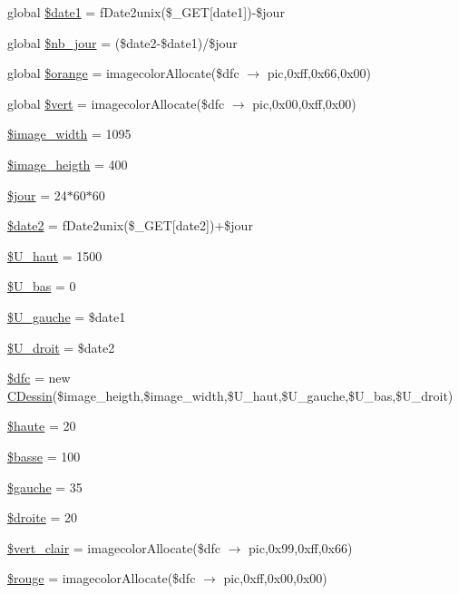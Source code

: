 \begin{CompactItemize}
\item 
global \hyperlink{graphe__veille__samu_8php_a0}{\$date1} = f\-Date2unix(\$\_\-GET\mbox{[}date1\mbox{]})-\$jour
\item 
global \hyperlink{graphe__veille__samu_8php_a1}{\$nb\_\-jour} = (\$date2-\$date1)/\$jour
\item 
global \hyperlink{graphe__veille__samu_8php_a2}{\$orange} = imagecolor\-Allocate(\$dfc $\rightarrow$ pic,0xff,0x66,0x00)
\item 
global \hyperlink{graphe__veille__samu_8php_a3}{\$vert} = imagecolor\-Allocate(\$dfc $\rightarrow$ pic,0x00,0xff,0x00)
\item 
\hyperlink{graphe__veille__samu_8php_a4}{\$image\_\-width} = 1095
\item 
\hyperlink{graphe__veille__samu_8php_a5}{\$image\_\-heigth} = 400
\item 
\hyperlink{graphe__veille__samu_8php_a6}{\$jour} = 24$\ast$60$\ast$60
\item 
\hyperlink{graphe__veille__samu_8php_a7}{\$date2} = f\-Date2unix(\$\_\-GET\mbox{[}date2\mbox{]})+\$jour
\item 
\hyperlink{graphe__veille__samu_8php_a8}{\$U\_\-haut} = 1500
\item 
\hyperlink{graphe__veille__samu_8php_a9}{\$U\_\-bas} = 0
\item 
\hyperlink{graphe__veille__samu_8php_a10}{\$U\_\-gauche} = \$date1
\item 
\hyperlink{graphe__veille__samu_8php_a11}{\$U\_\-droit} = \$date2
\item 
\hyperlink{graphe__veille__samu_8php_a12}{\$dfc} = new \hyperlink{classCDessin}{CDessin}(\$image\_\-heigth,\$image\_\-width,\$U\_\-haut,\$U\_\-gauche,\$U\_\-bas,\$U\_\-droit)
\item 
\hyperlink{graphe__veille__samu_8php_a13}{\$haute} = 20
\item 
\hyperlink{graphe__veille__samu_8php_a14}{\$basse} = 100
\item 
\hyperlink{graphe__veille__samu_8php_a15}{\$gauche} = 35
\item 
\hyperlink{graphe__veille__samu_8php_a16}{\$droite} = 20
\item 
\hyperlink{graphe__veille__samu_8php_a17}{\$vert\_\-clair} = imagecolor\-Allocate(\$dfc $\rightarrow$ pic,0x99,0xff,0x66)
\item 
\hyperlink{graphe__veille__samu_8php_a18}{\$rouge} = imagecolor\-Allocate(\$dfc $\rightarrow$ pic,0xff,0x00,0x00)
\item 

\end{CompactItemize}
